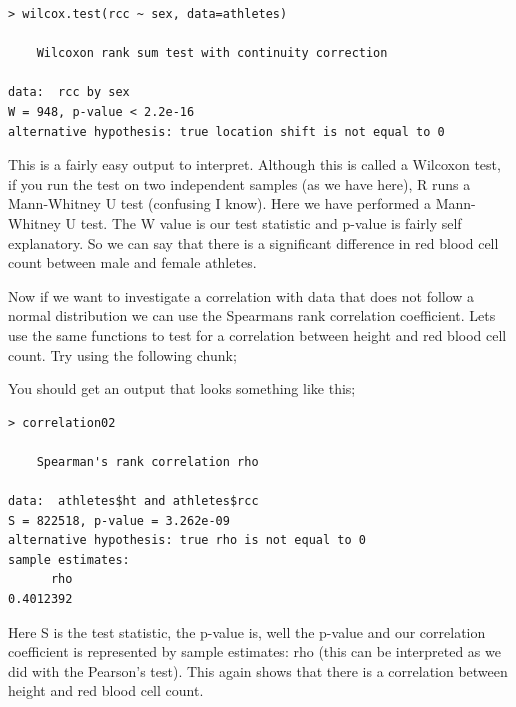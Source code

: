 \documentclass[
]{book}
\newenvironment{Shaded}{\begin{snugshade}}{\end{snugshade}}
\newcommand{\AttributeTok}[1]{\textcolor[rgb]{0.77,0.63,0.00}{#1}}
\newcommand{\CommentTok}[1]{\textcolor[rgb]{0.56,0.35,0.01}{\textit{#1}}}
\newcommand{\FunctionTok}[1]{\textcolor[rgb]{0.00,0.00,0.00}{#1}}
\newcommand{\NormalTok}[1]{#1}
\newcommand{\OtherTok}[1]{\textcolor[rgb]{0.56,0.35,0.01}{#1}}
\newcommand{\SpecialCharTok}[1]{\textcolor[rgb]{0.00,0.00,0.00}{#1}}
\newcommand{\StringTok}[1]{\textcolor[rgb]{0.31,0.60,0.02}{#1}}
\begin{document}
\begin{verbatim}
> wilcox.test(rcc ~ sex, data=athletes) 

    Wilcoxon rank sum test with continuity correction

data:  rcc by sex
W = 948, p-value < 2.2e-16
alternative hypothesis: true location shift is not equal to 0
\end{verbatim}

This is a fairly easy output to interpret. Although this is called a Wilcoxon test, if you run the test on two independent samples (as we have here), R runs a Mann-Whitney U test (confusing I know). Here we have performed a Mann-Whitney U test. The W value is our test statistic and p-value is fairly self explanatory. So we can say that there is a significant difference in red blood cell count between male and female athletes.

Now if we want to investigate a correlation with data that does not follow a normal distribution we can use the Spearmans rank correlation coefficient. Lets use the same functions to test for a correlation between height and red blood cell count. Try using the following chunk;

\begin{Shaded}
\end{Shaded}

You should get an output that looks something like this;

\begin{verbatim}
> correlation02

    Spearman's rank correlation rho

data:  athletes$ht and athletes$rcc
S = 822518, p-value = 3.262e-09
alternative hypothesis: true rho is not equal to 0
sample estimates:
      rho 
0.4012392
\end{verbatim}

Here S is the test statistic, the p-value is, well the p-value and our correlation coefficient is represented by sample estimates: rho (this can be interpreted as we did with the Pearson's test). This again shows that there is a correlation between height and red blood cell count.
\end{document}
